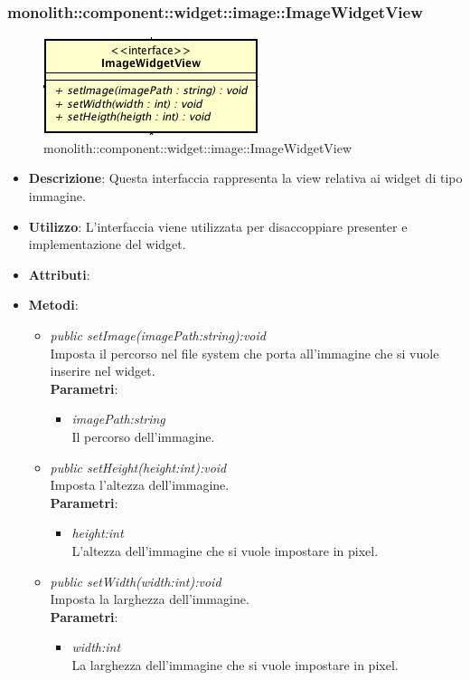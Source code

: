 \subsubsection{monolith::component::widget::image::ImageWidgetView}

\label{monolith::component::widget::image::ImageWidgetView}
\begin{figure}[H]
	\centering
	\includegraphics[scale=0.5]{Sezioni/SottosezioniST/img/ImageWidgetView.png}
	\caption{monolith::component::widget::image::ImageWidgetView}
\end{figure}

\begin{itemize}
\item \textbf{Descrizione}: Questa interfaccia rappresenta la view relativa ai widget di tipo immagine.
\item \textbf{Utilizzo}: L'interfaccia viene utilizzata per disaccoppiare presenter e implementazione del widget.
\item \textbf{Attributi}:
\item \textbf{Metodi}:
	\begin{itemize}
	\item \textit{public setImage(imagePath:string):void}\\
	Imposta il percorso nel file system che porta all'immagine che si vuole inserire nel widget.
		\\ \textbf{Parametri}: \begin{itemize}
		\item \textit{imagePath:string}\\
		Il percorso dell'immagine.
		\end{itemize} 
	\item \textit{public setHeight(height:int):void}\\
	Imposta l'altezza dell'immagine.
		\\ \textbf{Parametri}: \begin{itemize}
		\item \textit{height:int}\\
		L'altezza dell'immagine che si vuole impostare in pixel.
		\end{itemize} 
	\item \textit{public setWidth(width:int):void}\\
	Imposta la larghezza dell'immagine.
		\\ \textbf{Parametri}: \begin{itemize}
		\item \textit{width:int}\\
		La larghezza dell'immagine che si vuole impostare in pixel.
		\end{itemize} 
	\end{itemize}
\end{itemize}

